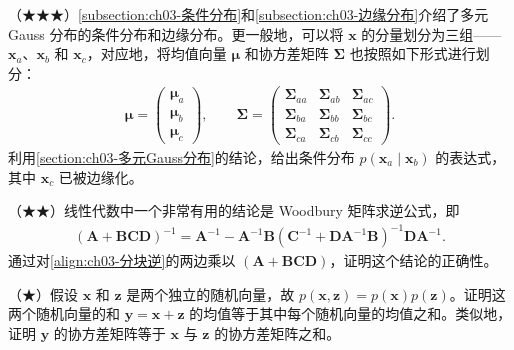 \documentclass[../../main.tex]{subfiles}
\begin{document}
\begin{exercise}\label{exercise:ch03-19}
（★★★）\cref{subsection:ch03-条件分布}和\cref{subsection:ch03-边缘分布}介绍了多元 Gauss 分布的条件分布和边缘分布。更一般地，可以将 $\boldsymbol{x}$ 的分量划分为三组——$\boldsymbol{x}_{a}$、$\boldsymbol{x}_{b}$ 和 $\boldsymbol{x}_{c}$，对应地，将均值向量 $\boldsymbol{\mu}$ 和协方差矩阵 $\boldsymbol{\Sigma}$ 也按照如下形式进行划分：
\begin{align*}
\boldsymbol{\mu}=\begin{pmatrix}\boldsymbol{\mu}_{a}\\ \boldsymbol{\mu}_{b}\\ \boldsymbol{\mu}_{c}\end{pmatrix},\qquad
\boldsymbol{\Sigma}=\begin{pmatrix}\boldsymbol{\Sigma}_{aa} & \boldsymbol{\Sigma}_{ab} & \boldsymbol{\Sigma}_{ac}\\ \boldsymbol{\Sigma}_{ba} & \boldsymbol{\Sigma}_{bb} & \boldsymbol{\Sigma}_{bc}\\ \boldsymbol{\Sigma}_{ca} & \boldsymbol{\Sigma}_{cb} & \boldsymbol{\Sigma}_{cc}\end{pmatrix}.
\end{align*}
利用\cref{section:ch03-多元Gauss分布}的结论，给出条件分布 $p(\boldsymbol{x}_{a}\mid\boldsymbol{x}_{b})$ 的表达式，其中 $\boldsymbol{x}_{c}$ 已被边缘化。
\end{exercise}

\begin{exercise}\label{exercise:ch03-20}
（★★）线性代数中一个非常有用的结论是 Woodbury 矩阵求逆公式，即
\begin{align*}
(\boldsymbol{A}+\boldsymbol{B}\boldsymbol{C}\boldsymbol{D})^{-1}=\boldsymbol{A}^{-1}-\boldsymbol{A}^{-1}\boldsymbol{B}(\boldsymbol{C}^{-1}+\boldsymbol{D}\boldsymbol{A}^{-1}\boldsymbol{B})^{-1}\boldsymbol{D}\boldsymbol{A}^{-1}.
\end{align*}
通过对\eqref{align:ch03-分块逆}的两边乘以 $(\boldsymbol{A}+\boldsymbol{B}\boldsymbol{C}\boldsymbol{D})$，证明这个结论的正确性。
\end{exercise}

\begin{exercise}\label{exercise:ch03-21}
（★）假设 $\boldsymbol{x}$ 和 $\boldsymbol{z}$ 是两个独立的随机向量，故 $p(\boldsymbol{x},\boldsymbol{z})=p(\boldsymbol{x})p(\boldsymbol{z})$。证明这两个随机向量的和 $\boldsymbol{y}=\boldsymbol{x}+\boldsymbol{z}$ 的均值等于其中每个随机向量的均值之和。类似地，证明 $\boldsymbol{y}$ 的协方差矩阵等于 $\boldsymbol{x}$ 与 $\boldsymbol{z}$ 的协方差矩阵之和。
\end{exercise}
\end{document}

